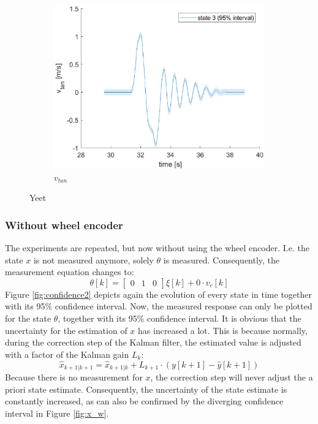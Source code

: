 \documentclass[a4paper,kul]{kulakarticle} %
\begin{document}
\begin{figure}[htp!]
	\begin{subfigure}[b]{0.48\textwidth}
		\centering 
		\includegraphics[width=\textwidth]{state3.eps}
		\caption{$v_{tan}$}
	\end{subfigure}
	\caption{Yeet} 
	\label{fig:confidence1}
\end{figure}




\subsubsection*{Without wheel encoder}
The experiments are repeated, but now without using the wheel encoder. I.e. the state $x$ is not measured anymore, solely $\theta$ is measured. Consequently, the measurement equation changes to:
\begin{equation}
		\theta[k] = \begin{bmatrix}
		0&1&0
	\end{bmatrix}\xi[k] + 0 \cdot v_c[k]
\end{equation}
Figure \ref{fig:confidence2} depicts again the evolution of every state in time together with its 95\% confidence interval. Now, the measured response can only be plotted for the state $\theta$, together with its 95\% confidence interval. It is obvious that the uncertainty for the estimation of $x$ has increased a lot. This is because normally, during the correction step of the Kalman filter, the estimated value is adjusted with a factor of the Kalman gain $L_k$:
\begin{equation}
	\hat{x}_{k+1|k+1} = \hat{x}_{k+1|k} + L_{k+1} \cdot \left(y[k+1] - \hat{y}[k+1]\right)
\end{equation}
Because there is no measurement for $x$, the correction step will never adjust the a priori state estimate. Consequently, the uncertainty of the state estimate is constantly increased, as can also be confirmed by the diverging confidence interval in Figure \ref{fig:x_w}. 
\end{document}
